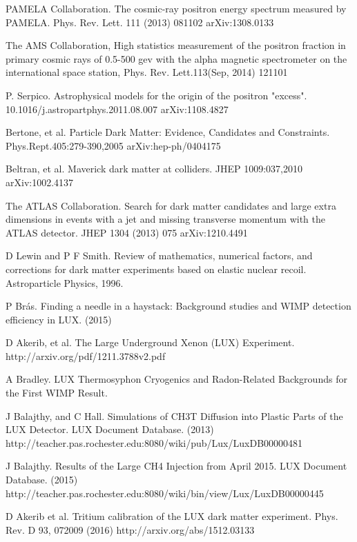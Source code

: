 \documentclass[a4paper,12pt]{article}
\begin{document}
{\begin{thebibliography}{1}
 PAMELA Collaboration.  The cosmic-ray positron energy spectrum measured by PAMELA.  Phys. Rev. Lett. 111 (2013) 081102  	arXiv:1308.0133 

 The AMS Collaboration, High statistics measurement of the positron fraction in primary cosmic rays of 0.5-500 gev with the alpha magnetic spectrometer on the international space station, Phys. Rev. Lett.113(Sep, 2014) 121101

 P. Serpico. Astrophysical models for the origin of the positron "excess". 10.1016/j.astropartphys.2011.08.007  	arXiv:1108.4827

 Bertone, et al. Particle Dark Matter: Evidence, Candidates and Constraints. Phys.Rept.405:279-390,2005 arXiv:hep-ph/0404175

 Beltran, et al.  Maverick dark matter at colliders.  JHEP 1009:037,2010 arXiv:1002.4137

 The ATLAS Collaboration. Search for dark matter candidates and large extra dimensions in events with a jet and missing transverse momentum with the ATLAS detector. JHEP 1304 (2013) 075 arXiv:1210.4491 

  D Lewin and P F Smith.  Review of mathematics, numerical factors, and
corrections for dark matter experiments based on elastic nuclear recoil.
Astroparticle Physics, 1996.

 P Br\'as. Finding a needle in a haystack: Background studies and WIMP detection efficiency in LUX. (2015)

 D Akerib, et al.  The Large Underground Xenon (LUX) Experiment.  http://arxiv.org/pdf/1211.3788v2.pdf

 A Bradley. LUX Thermosyphon Cryogenics and Radon-Related Backgrounds for the First WIMP Result. %

 J Balajthy, and C Hall. Simulations of CH3T Diffusion into Plastic Parts of the LUX Detector. LUX Document Database. (2013) http://teacher.pas.rochester.edu:8080/wiki/pub/Lux/LuxDB00000481

 J Balajthy.  Results of the Large CH4 Injection from April 2015.  LUX Document Database. (2015) http://teacher.pas.rochester.edu:8080/wiki/bin/view/Lux/LuxDB00000445

 D Akerib et al.  Tritium calibration of the LUX dark matter experiment.  	Phys. Rev. D 93, 072009 (2016)  http://arxiv.org/abs/1512.03133


\end{thebibliography}}
\end{document}
